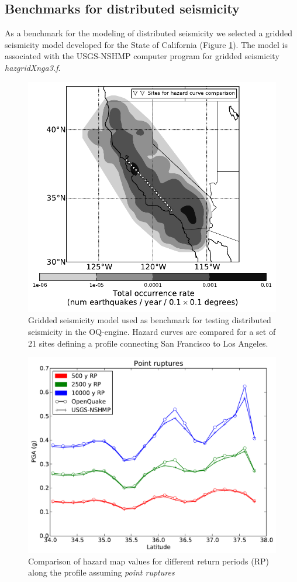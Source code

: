 \subsection{Benchmarks for distributed seismicity}
As a benchmark for the modeling of distributed seismicity we selected a gridded
seismicity model developed for the State of California (Figure
\ref{fig:cal_grid}). The model is associated with the USGS-NSHMP computer
program for gridded seismicity \textit{hazgridXnga3.f}. 
%
\begin{figure}[htb]
\centering
\includegraphics[width=12cm]{./qareport/pictures/CAmapC_21.pdf}
\caption{Gridded seismicity model used as benchmark for testing distributed
seismicity in the OQ-engine. Hazard curves are compared for a set of 21 sites
defining a profile connecting San Francisco to Los Angeles.}
\label{fig:cal_grid}
\end{figure}
%
\begin{figure}[!ht]
\centering
\includegraphics[width=12.5cm]{./qareport/pictures/gridded_seismicity_oq_nshmp_point.pdf}
\caption{Comparison of hazard map values for different return periods (RP) along the profile assuming \textit{point ruptures}}
\label{fig:cal_grid_map_point}
\end{figure}

